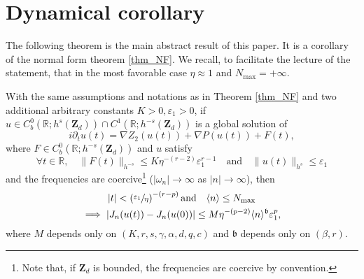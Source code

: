 \section{Dynamical corollary}
\label{sec_dyn_co}

The following theorem is the main abstract result of this paper. It is a corollary of the normal form theorem \ref{thm_NF}. We recall, to facilitate the lecture of the statement, that in the most favorable case $\eta\approx 1$ and $N_{\max}= +\infty$.
\begin{theorem}
\label{thm_main_dyn} With the same assumptions and notations as in Theorem \ref{thm_NF} and two additional arbitrary constants $K>0,\varepsilon_1>0$, if $u\in C^0_b(\mathbb{R};h^s(\mathbf{Z}_d))\cap C^1(\mathbb{R};h^{-s}(\mathbf{Z}_d))$ is a global solution of
\begin{equation}
\label{eq_non_auto}
i\partial_t u(t) = \nabla Z_2(u(t)) + \nabla P(u(t)) + F(t),
\end{equation}
where $F\in C^0_b(\mathbb{R};h^{-s}(\mathbf{Z}_d))$ and $u$ satisfy
\[
\forall t\in \mathbb{R}, \quad \| F(t) \|_{h^{-s}} \leq K \eta^{-(r-2)}\varepsilon_1^{r-1} \quad \text{and} \quad \| u(t) \|_{h^s} \leq \varepsilon_1
\]
and the frequencies are coercive\footnote{Note that, if $\mathbf{Z}_d$ is bounded, the frequencies are coercive by convention.} (\ie $|\omega_n| \to \infty$ as $|n| \to \infty$),
then
\begin{multline}
\label{eq_Willy}
|t|< \left(\sfrac{\varepsilon_1 }{\eta} \right)^{-(r-p)} \text{and} \quad \langle n \rangle \leq N_{\max} \\ \implies |J_n(u(t))-J_n(u(0))|\leq M \eta ^{-(p-2)} \langle n \rangle^{\mathfrak{b}} \varepsilon_1^{p},
\end{multline}
where $M$ depends only on $(K,r,s,\gamma,\alpha,d,q,c)$ and $\mathfrak{b}$ depends only on $(\beta,r)$.
\end{theorem}
